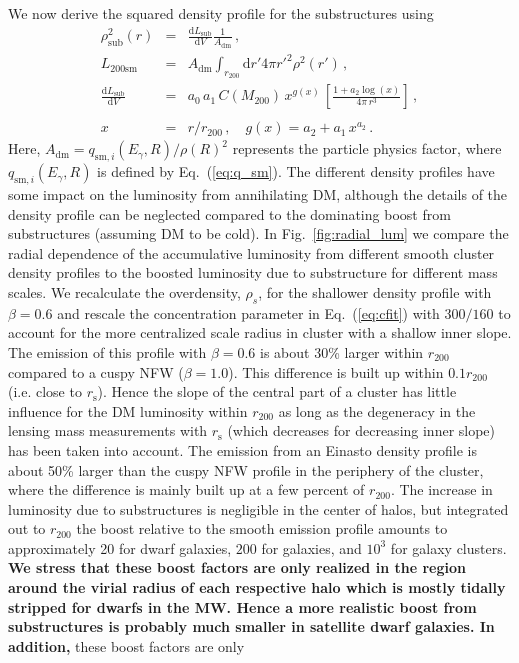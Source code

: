 \documentclass[10pt,aps,pra,reprint,amsmath,amsfonts,amssymb,showpacs,nofootinbib,floatfix]{revtex4-1}
\def\C#1{{\bf #1}}
\newcommand{\rmn}{\mathrm}
\newcommand{\s}{\rmn{s}}
\newcommand{\sm}{\rmn{sm}}
\newcommand{\dd}{\rmn{d}}
\newcommand{\rhos}{\ensuremath{\rho_s}}
\newcommand{\rvir}{r_{200}}
\newcommand{\mvir}{M_{200}}
\newcommand{\eg}{E_\gamma}
\begin{document}
We now derive the squared density profile for the substructures
using
\begin{eqnarray}
\rho_\rmn{sub}^2(r) &=& \frac{\dd L_\rmn{sub}}{\dd V} \frac{1}{A_{\rmn{dm}}}\,,\label{eq:rho_sub}\\
L_{200\sm} &=& A_{\rmn{dm}} \int_{\rvir} \dd r' 4\pi r'^2 \rho^2(r')\,,\label{eq:Lsm}\\
 \frac{\dd L_\rmn{sub}}{\dd V} &=& a_0\,a_1\,C(\mvir)\,x^{g(x)}\,
\left[\frac{1+a_2\log(x)}{4\pi\,r^3}\right]\,,\nonumber\\
\\
x &=& r/\rvir\,,\quad g(x) = a_2+a_1\,x^{a_2}\,.\label{eq:xvir}
\end{eqnarray}
Here, $A_{\rmn{dm}} = q_{\rmn{sm},i}(\eg,R) / \rho(R)^2$ represents
the particle physics factor, where $q_{\rmn{sm},i}(\eg,R)$ is defined
by Eq.~(\ref{eq:q_sm}). The different density profiles have some
impact on the luminosity from annihilating DM, although the details of
the density profile can be neglected compared to the dominating boost
from substructures (assuming DM to be cold). In
Fig.~\ref{fig:radial_lum} we compare the radial dependence of the
accumulative luminosity from different smooth cluster density profiles
to the boosted luminosity due to substructure for different mass
scales. We recalculate the overdensity, $\rhos$, for the shallower
density profile with $\beta=0.6$ and rescale the concentration
parameter in Eq.~(\ref{eq:cfit}) with $300/160$
\cite{2011ApJ...728L..39N} to account for the more centralized scale
radius in cluster with a shallow inner slope. The emission of this
profile with $\beta=0.6$ is about 30\% larger within $\rvir$ compared
to a cuspy NFW ($\beta=1.0$). This difference is built up within
$0.1\rvir$ (i.e. close to $r_\s$). Hence the slope of the central part
of a cluster has little influence for the DM luminosity within $\rvir$
as long as the degeneracy in the lensing mass measurements with $r_\s$
(which decreases for decreasing inner slope) has been taken into
account. The emission from an Einasto density profile is about 50\%
larger than the cuspy NFW profile in the periphery of the cluster,
where the difference is mainly built up at a few percent of
$\rvir$. The increase in luminosity due to substructures is negligible
in the center of halos, but integrated out to $\rvir$ the boost
relative to the smooth emission profile amounts to approximately 20
for dwarf galaxies, $200$ for galaxies, and $10^3$ for galaxy
clusters. \C{We stress that these boost factors are only realized in
  the region around the virial radius of each respective halo which
  is mostly tidally stripped for dwarfs in the MW. Hence a more
  realistic boost from substructures is probably much smaller in
  satellite dwarf galaxies. In addition,} these boost factors are only
\end{document}
